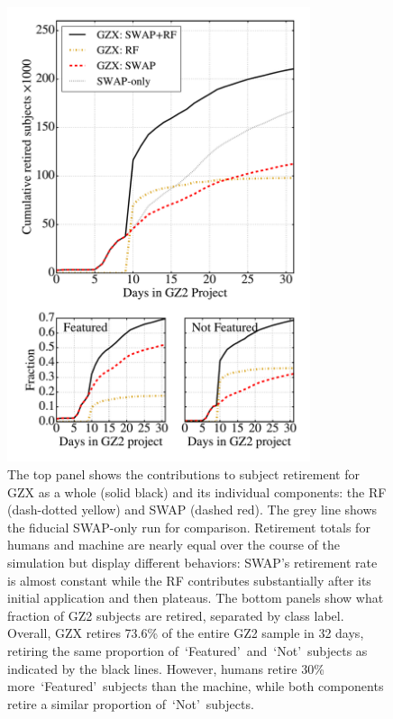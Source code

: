 \documentclass[twocolumn]{aastex6}
\newcommand{\feat}{`Featured'}
\newcommand{\notfeat}{`Not'}
\begin{document}
\begin{figure}[t!]
\includegraphics[width=3.5in]{figures/GZX_component_contributions.pdf}
\caption{The top panel shows the contributions to subject retirement for GZX as a whole (solid black) and its individual components: the RF (dash-dotted yellow) and SWAP (dashed red). The grey line shows the fiducial SWAP-only run for comparison. Retirement totals for humans and machine are nearly equal over the course of the simulation but display different behaviors: SWAP's retirement rate is almost constant while the RF contributes substantially after its initial application and then plateaus.  The bottom panels show what fraction of GZ2 subjects are retired, separated by class label. Overall, GZX retires 73.6\% of the entire GZ2 sample in 32 days, retiring the same proportion of~\feat~and~\notfeat~subjects as indicated by the black lines. However, humans retire 30\% more~\feat~subjects than the machine, while both components retire a similar proportion of~\notfeat~subjects. \label{fig: gzx components}}
\end{figure}
\end{document}
